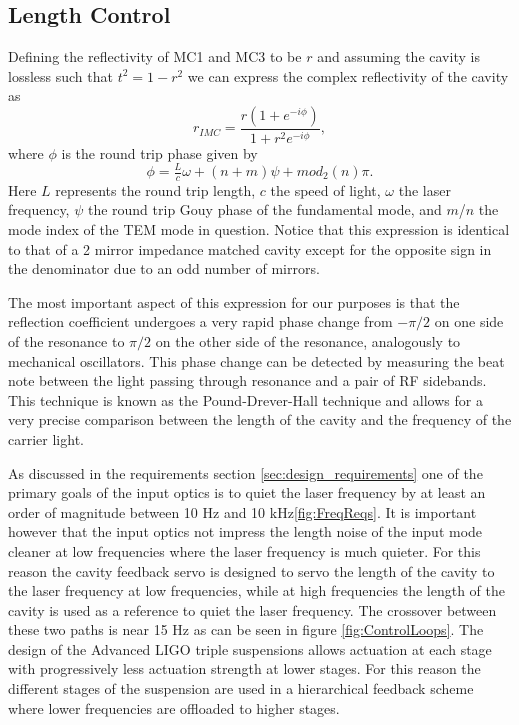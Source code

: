 \subsection{Length Control}
\label{sec:length_control}

Defining the reflectivity of MC1 and MC3 to be $r$ and assuming the cavity is lossless such that 
$t^2 = 1-r^2$ we can express the complex reflectivity of the cavity as 
\begin{equation}
	r_{IMC} = \frac{r(1+e^{-i\phi})}{1+r^2e^{-i\phi}},
\end{equation}
where $\phi$ is the round trip phase given by 
\begin{equation}
	\phi=\tfrac{L}{c}\omega+(n+m)\psi+mod_2(n)\pi.
	\label{eq:phi}
\end{equation}	
Here $L$ represents the round trip length, $c$ the speed of light, $\omega$ the laser frequency, 
$\psi$ the round trip Gouy phase of the fundamental mode, and $m$/$n$ the mode index of the 
TEM mode in question.  
Notice that this expression is identical to that of a 2 mirror impedance matched cavity except 
for the opposite sign in the denominator due to an odd number of mirrors.  

The most important aspect of this expression for our purposes is that the reflection coefficient 
undergoes a very rapid phase change from $-\pi/2$ on one side of the resonance to $\pi/2$ 
on the other side of the resonance, analogously to mechanical oscillators.  
This phase change can be detected by measuring the beat note between the light passing 
through resonance and a pair of RF sidebands.  
This technique is known as the Pound-Drever-Hall technique\cite{black_introduction_2001}\cite{drever_laser_1983} 
and allows for a very precise comparison between the length of the cavity and the frequency 
of the carrier light.  

As discussed in the requirements section \ref{sec:design_requirements} one of the primary 
goals of the input optics is to quiet the laser frequency by at least an order of magnitude 
between 10 Hz and 10 kHz\ref{fig:FreqReqs}.  
It is important however that the input optics not impress the length noise of the input mode 
cleaner at low frequencies where the laser frequency is much quieter.  
For this reason the cavity feedback servo is designed to servo the length of the 
cavity to the laser frequency at low frequencies, while at high frequencies the 
length of the cavity is used as a reference to quiet the laser frequency.  
The crossover between these two paths is near 15 Hz as can be seen in figure 
\ref{fig:ControlLoops}.  
The design of the Advanced LIGO triple suspensions allows actuation at each stage 
with progressively less actuation strength at lower stages.  
For this reason the different stages of the suspension are used in a hierarchical 
feedback scheme where lower frequencies are offloaded to higher stages.  

